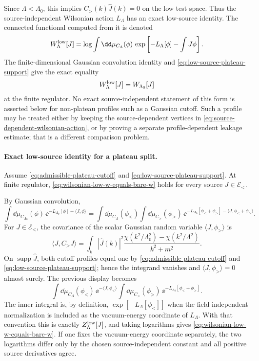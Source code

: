 Since \(\Lambda<\Lambda_0\), this implies \(C_>(k)\widehat J(k)=0\) on the low
test space.  Thus the source-independent Wilsonian action \(L_\Lambda\) has
an exact low-source identity.  The connected functional computed from it is
denoted
\[
  W_{\Lambda}^{\rm low}[J]
  =
  \log
  \int\dd\mu_{C_\Lambda}(\phi)\,
  \exp\left[
    -L_\Lambda[\phi]
    -\int J\phi
  \right].
\]
The finite-dimensional Gaussian convolution identity and
\eqref{eq:low-source-plateau-support} give the exact equality
\begin{equation}
  W_{\Lambda}^{\rm low}[J]=W_{\Lambda_0}[J]
  \label{eq:wilsonian-low-w-equals-bare-w}
\end{equation}
at the finite regulator.  No exact source-independent statement of this form
is asserted below for non-plateau profiles such as a Gaussian cutoff.  Such a
profile may be treated either by keeping the source-dependent vertices in
\eqref{eq:source-dependent-wilsonian-action}, or by proving a separate
profile-dependent leakage estimate; that is a different comparison problem.

\paragraph{Exact low-source identity for a plateau split.}
Assume \eqref{eq:admissible-plateau-cutoff} and
\eqref{eq:low-source-plateau-support}.  At finite regulator,
\eqref{eq:wilsonian-low-w-equals-bare-w} holds for every source
\(J\in\mathcal E_<\).

By Gaussian convolution,
\[
  \int\dd\mu_{C_{\Lambda_0}}(\phi)\,
  \ee^{-L_{\Lambda_0}[\phi]-\langle J,\phi\rangle}
  =
  \int\dd\mu_{C_\Lambda}(\phi_<)
  \int\dd\mu_{C_>}(\phi_>)\,
  \ee^{-L_{\Lambda_0}[\phi_<+\phi_>]
      -\langle J,\phi_<+\phi_>\rangle}.
\]
For \(J\in\mathcal E_<\), the covariance of the scalar Gaussian random
variable \(\langle J,\phi_>\rangle\) is
\[
  \langle J,C_>J\rangle
  =
  \int_k |\widehat J(k)|^2
  \frac{\chi(k^2/\Lambda_0^2)-\chi(k^2/\Lambda^2)}{k^2+m^2}.
\]
On \(\operatorname{supp}\widehat J\), both cutoff profiles equal one by
\eqref{eq:admissible-plateau-cutoff} and
\eqref{eq:low-source-plateau-support}; hence the integrand vanishes and
\(\langle J,\phi_>\rangle=0\) almost surely.  The previous display becomes
\[
  \int\dd\mu_{C_\Lambda}(\phi_<)\,
  \ee^{-\langle J,\phi_<\rangle}
  \int\dd\mu_{C_>}(\phi_>)\,
  \ee^{-L_{\Lambda_0}[\phi_<+\phi_>]}.
\]
The inner integral is, by definition, \(\exp[-L_\Lambda[\phi_<]]\) when the
field-independent normalization is included as the vacuum-energy coordinate
of \(L_\Lambda\).  With that convention this is exactly
\(Z_\Lambda^{\rm low}[J]\), and taking logarithms gives
\eqref{eq:wilsonian-low-w-equals-bare-w}.  If one fixes the vacuum-energy
coordinate separately, the two logarithms differ only by the chosen
source-independent constant and all positive source derivatives agree.

